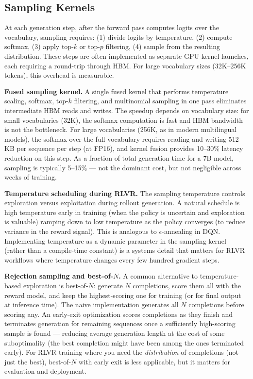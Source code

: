 \subsection{Sampling Kernels}

At each generation step, after the forward pass computes logits over the vocabulary, sampling requires: (1) divide logits by temperature, (2) compute softmax, (3) apply top-$k$ or top-$p$ filtering, (4) sample from the resulting distribution. These steps are often implemented as separate GPU kernel launches, each requiring a round-trip through HBM. For large vocabulary sizes (32K--256K tokens), this overhead is measurable.

\textbf{Fused sampling kernel.} A single fused kernel that performs temperature scaling, softmax, top-$k$ filtering, and multinomial sampling in one pass eliminates intermediate HBM reads and writes. The speedup depends on vocabulary size: for small vocabularies (32K), the softmax computation is fast and HBM bandwidth is not the bottleneck. For large vocabularies (256K, as in modern multilingual models), the softmax over the full vocabulary requires reading and writing 512 KB per sequence per step (at FP16), and kernel fusion provides 10--30\% latency reduction on this step. As a fraction of total generation time for a 7B model, sampling is typically 5--15\% --- not the dominant cost, but not negligible across weeks of training.

\textbf{Temperature scheduling during RLVR.} The sampling temperature controls exploration versus exploitation during rollout generation. A natural schedule is high temperature early in training (when the policy is uncertain and exploration is valuable) ramping down to low temperature as the policy converges (to reduce variance in the reward signal). This is analogous to $\epsilon$-annealing in DQN. Implementing temperature as a dynamic parameter in the sampling kernel (rather than a compile-time constant) is a systems detail that matters for RLVR workflows where temperature changes every few hundred gradient steps.

\textbf{Rejection sampling and best-of-$N$.} A common alternative to temperature-based exploration is best-of-$N$: generate $N$ completions, score them all with the reward model, and keep the highest-scoring one for training (or for final output at inference time). The naive implementation generates all $N$ completions before scoring any. An early-exit optimization scores completions as they finish and terminates generation for remaining sequences once a sufficiently high-scoring sample is found --- reducing average generation length at the cost of some suboptimality (the best completion might have been among the ones terminated early). For RLVR training where you need the \textit{distribution} of completions (not just the best), best-of-$N$ with early exit is less applicable, but it matters for evaluation and deployment.

